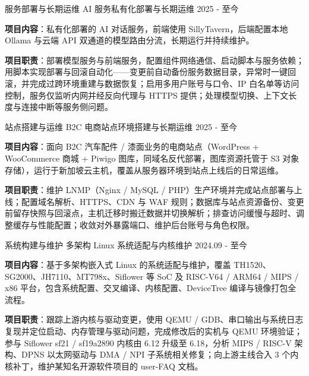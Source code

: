 
\begin{cventries}

  \cventry
    {服务部署与长期运维}
    {AI 服务私有化部署与长期运维}
    {}
    {2025 - 至今}
    {
      \begin{cvitems}
        \item {\textbf{项目内容}：私有化部署的 AI 对话服务，前端使用 SillyTavern，后端配置本地 Ollama 与云端 API 双通道的模型路由分流，长期运行并持续维护。}
        \item {\textbf{项目职责}：部署模型服务与前端服务，配置组件网络通信、启动脚本与服务依赖；用脚本实现部署与回滚自动化——变更前自动备份服务数据目录，异常时一键回滚，并完成过跨环境重建与数据恢复；启用多用户账号与口令、IP 白名单等访问控制，服务仅监听内网并经反向代理与 HTTPS 提供；处理模型切换、上下文长度与连接中断等服务侧问题。}
      \end{cvitems}
    }

  \cventry
    {站点搭建与运维}
    {B2C 电商站点环境搭建与长期运维}
    {}
    {2025 - 至今}
    {
      \begin{cvitems}
        \item {\textbf{项目内容}：面向 B2C 汽车配件 / 漆面业务的电商站点（WordPress + WooCommerce 商城 + Piwigo 图库，同域名反代部署，图库资源托管于 S3 对象存储），运行于新加坡云主机，覆盖从服务器环境到站点上线后的日常运维。}
        \item {\textbf{项目职责}：维护 LNMP（Nginx / MySQL / PHP）生产环境并完成站点部署与上线；配置域名解析、HTTPS、CDN 与 WAF 规则；数据库与站点资源备份、变更前留存快照与回滚点，主机迁移时搬迁数据并切换解析；排查访问缓慢与超时、调整缓存与性能配置；收敛对外暴露端口、维护后台账号与角色权限。}
      \end{cvitems}
    }

  \cventry
    {系统构建与维护}
    {多架构 Linux 系统适配与内核维护}
    {}
    {2024.09 - 至今}
    {
      \begin{cvitems}
        \item {\textbf{项目内容}：基于多架构嵌入式 Linux 的系统适配与维护，覆盖 TH1520、SG2000、JH7110、MT798x、Siflower 等 SoC 及 RISC-V64 / ARM64 / MIPS / x86 平台，包含系统配置、交叉编译、内核配置、Device\nobreakspace{}Tree 编译与镜像打包全流程。}
        \item {\textbf{项目职责}：跟踪上游内核与驱动变更，使用 QEMU / GDB、串口输出与系统日志复现并定位启动、内存管理与驱动问题，完成修改后的实机与 QEMU 环境验证；参与 Siflower sf21 / sf19a2890 内核由 6.12 升级至 6.18，分析 MIPS / RISC-V 架构、DPNS 以太网驱动与 DMA / NPI 子系统相关修复；向上游主线合入 3 个内核补丁，维护某知名开源软件项目的 user-FAQ 文档。}
      \end{cvitems}
    }

\end{cventries}
